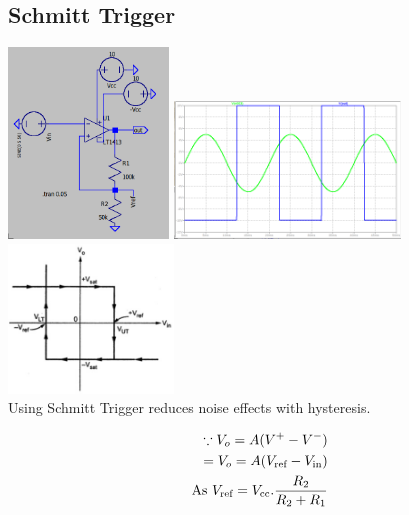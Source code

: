 \documentclass[a4paper, 12pt]{report}
\begin{document}
\begin{center}
\begin{center}
\begin{center}
\begin{center}
\begin{center}
\begin{center}
\begin{center}
\begin{center}
\begin{center}
\begin{center}
\begin{center}
\begin{center}
\subsection{Schmitt Trigger}
\includegraphics[width=0.32\textwidth]{figures/23c.png}
\includegraphics[width=0.45\textwidth]{figures/23w.png}
\includegraphics[width=0.33\textwidth]{figures/schmitt.jpg}\\
Using Schmitt Trigger reduces noise effects with hysteresis.

\begin{equation}
    \notag
    \begin{align}
    \because V_o = A(V^{+} - V^{-})\\
    = V_o = A(V_\text{ref} - V_\text{in})\\
    \text{As\ } V_\text{ref} = V_\text{cc} . \frac{R_2}{R_2 + R_1}
    \end{align}
\end{equation}

\end{center}
\end{center}
\end{center}
\end{center}
\end{center}
\end{center}
\end{center}
\end{center}
\end{center}
\end{center}
\end{center}
\end{center}
\end{document}
